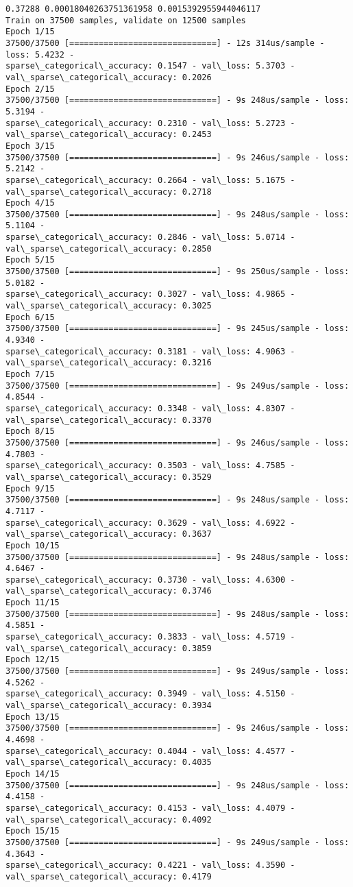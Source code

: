 \documentclass[11pt]{article}
\begin{document}
    \begin{Verbatim}[commandchars=\\\{\}]
0.37288 0.00018040263751361958 0.0015392955944046117
Train on 37500 samples, validate on 12500 samples
Epoch 1/15
37500/37500 [==============================] - 12s 314us/sample - loss: 5.4232 -
sparse\_categorical\_accuracy: 0.1547 - val\_loss: 5.3703 -
val\_sparse\_categorical\_accuracy: 0.2026
Epoch 2/15
37500/37500 [==============================] - 9s 248us/sample - loss: 5.3194 -
sparse\_categorical\_accuracy: 0.2310 - val\_loss: 5.2723 -
val\_sparse\_categorical\_accuracy: 0.2453
Epoch 3/15
37500/37500 [==============================] - 9s 246us/sample - loss: 5.2142 -
sparse\_categorical\_accuracy: 0.2664 - val\_loss: 5.1675 -
val\_sparse\_categorical\_accuracy: 0.2718
Epoch 4/15
37500/37500 [==============================] - 9s 248us/sample - loss: 5.1104 -
sparse\_categorical\_accuracy: 0.2846 - val\_loss: 5.0714 -
val\_sparse\_categorical\_accuracy: 0.2850
Epoch 5/15
37500/37500 [==============================] - 9s 250us/sample - loss: 5.0182 -
sparse\_categorical\_accuracy: 0.3027 - val\_loss: 4.9865 -
val\_sparse\_categorical\_accuracy: 0.3025
Epoch 6/15
37500/37500 [==============================] - 9s 245us/sample - loss: 4.9340 -
sparse\_categorical\_accuracy: 0.3181 - val\_loss: 4.9063 -
val\_sparse\_categorical\_accuracy: 0.3216
Epoch 7/15
37500/37500 [==============================] - 9s 249us/sample - loss: 4.8544 -
sparse\_categorical\_accuracy: 0.3348 - val\_loss: 4.8307 -
val\_sparse\_categorical\_accuracy: 0.3370
Epoch 8/15
37500/37500 [==============================] - 9s 246us/sample - loss: 4.7803 -
sparse\_categorical\_accuracy: 0.3503 - val\_loss: 4.7585 -
val\_sparse\_categorical\_accuracy: 0.3529
Epoch 9/15
37500/37500 [==============================] - 9s 248us/sample - loss: 4.7117 -
sparse\_categorical\_accuracy: 0.3629 - val\_loss: 4.6922 -
val\_sparse\_categorical\_accuracy: 0.3637
Epoch 10/15
37500/37500 [==============================] - 9s 248us/sample - loss: 4.6467 -
sparse\_categorical\_accuracy: 0.3730 - val\_loss: 4.6300 -
val\_sparse\_categorical\_accuracy: 0.3746
Epoch 11/15
37500/37500 [==============================] - 9s 248us/sample - loss: 4.5851 -
sparse\_categorical\_accuracy: 0.3833 - val\_loss: 4.5719 -
val\_sparse\_categorical\_accuracy: 0.3859
Epoch 12/15
37500/37500 [==============================] - 9s 249us/sample - loss: 4.5262 -
sparse\_categorical\_accuracy: 0.3949 - val\_loss: 4.5150 -
val\_sparse\_categorical\_accuracy: 0.3934
Epoch 13/15
37500/37500 [==============================] - 9s 246us/sample - loss: 4.4698 -
sparse\_categorical\_accuracy: 0.4044 - val\_loss: 4.4577 -
val\_sparse\_categorical\_accuracy: 0.4035
Epoch 14/15
37500/37500 [==============================] - 9s 248us/sample - loss: 4.4158 -
sparse\_categorical\_accuracy: 0.4153 - val\_loss: 4.4079 -
val\_sparse\_categorical\_accuracy: 0.4092
Epoch 15/15
37500/37500 [==============================] - 9s 249us/sample - loss: 4.3643 -
sparse\_categorical\_accuracy: 0.4221 - val\_loss: 4.3590 -
val\_sparse\_categorical\_accuracy: 0.4179
    \end{Verbatim}
\end{document}
